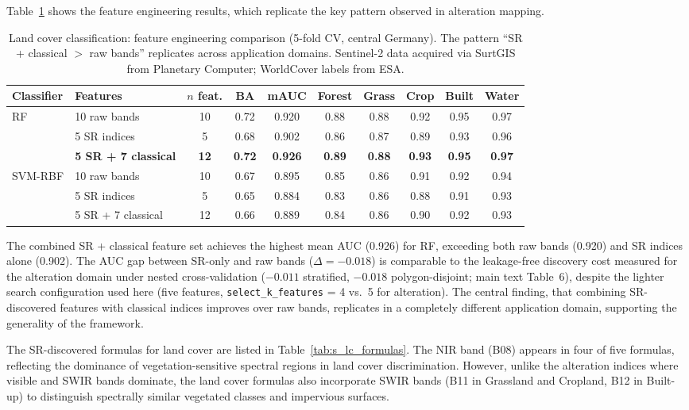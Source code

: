 \documentclass[review,authoryear]{elsarticle}
\begin{document}
Table~\ref{tab:s_landcover} shows the feature engineering results, which replicate the key pattern observed in alteration mapping.

\begin{table}[ht]
\centering
\caption{Land cover classification: feature engineering comparison (5-fold CV, central Germany). The pattern ``SR + classical $>$ raw bands'' replicates across application domains. Sentinel-2 data acquired via SurtGIS \citep{Parra2026surtgis} from Planetary Computer; WorldCover labels from ESA.}
\label{tab:s_landcover}
\begin{tabular}{llcccccccc}
\toprule
Classifier & Features & $n$ feat. & BA & mAUC & Forest & Grass & Crop & Built & Water \\
\midrule
\multirow{3}{*}{RF}
  & 10 raw bands        & 10 & 0.72 & 0.920 & 0.88 & 0.88 & 0.92 & 0.95 & 0.97 \\
  & 5 SR indices         & 5  & 0.68 & 0.902 & 0.86 & 0.87 & 0.89 & 0.93 & 0.96 \\
  & \textbf{5 SR + 7 classical} & \textbf{12} & \textbf{0.72} & \textbf{0.926} & \textbf{0.89} & \textbf{0.88} & \textbf{0.93} & \textbf{0.95} & \textbf{0.97} \\
\midrule
\multirow{3}{*}{SVM-RBF}
  & 10 raw bands        & 10 & 0.67 & 0.895 & 0.85 & 0.86 & 0.91 & 0.92 & 0.94 \\
  & 5 SR indices         & 5  & 0.65 & 0.884 & 0.83 & 0.86 & 0.88 & 0.91 & 0.93 \\
  & 5 SR + 7 classical  & 12 & 0.66 & 0.889 & 0.84 & 0.86 & 0.90 & 0.92 & 0.93 \\
\bottomrule
\end{tabular}
\end{table}

The combined SR + classical feature set achieves the highest mean AUC (0.926) for RF, exceeding both raw bands (0.920) and SR indices alone (0.902). The AUC gap between SR-only and raw bands ($\Delta = -0.018$) is comparable to the leakage-free discovery cost measured for the alteration domain under nested cross-validation ($-0.011$ stratified, $-0.018$ polygon-disjoint; main text Table~6), despite the lighter search configuration used here (five features, \texttt{select\_k\_features} = 4 vs.\ 5 for alteration). The central finding, that combining SR-discovered features with classical indices improves over raw bands, replicates in a completely different application domain, supporting the generality of the framework.

The SR-discovered formulas for land cover are listed in Table~\ref{tab:s_lc_formulas}. The NIR band (B08) appears in four of five formulas, reflecting the dominance of vegetation-sensitive spectral regions in land cover discrimination. However, unlike the alteration indices where visible and SWIR bands dominate, the land cover formulas also incorporate SWIR bands (B11 in Grassland and Cropland, B12 in Built-up) to distinguish spectrally similar vegetated classes and impervious surfaces.
\end{document}
